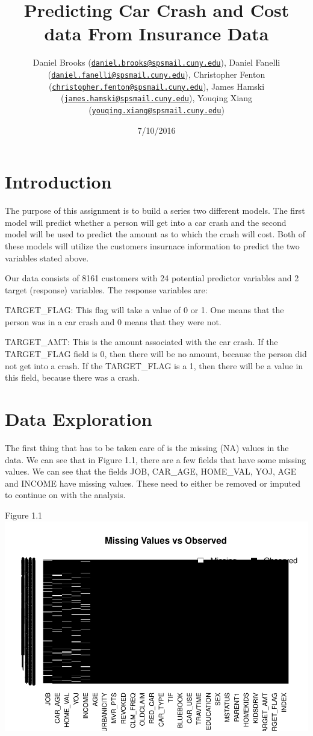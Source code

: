 \documentclass[]{article}
\title{Predicting Car Crash and Cost data From Insurance Data}
\author{Daniel Brooks
(\href{mailto:daniel.brooks@spsmail.cuny.edu}{\nolinkurl{daniel.brooks@spsmail.cuny.edu}}),
Daniel Fanelli
(\href{mailto:daniel.fanelli@spsmail.cuny.edu}{\nolinkurl{daniel.fanelli@spsmail.cuny.edu}}),
Christopher Fenton
(\href{mailto:christopher.fenton@spsmail.cuny.edu}{\nolinkurl{christopher.fenton@spsmail.cuny.edu}}),
James Hamski
(\href{mailto:james.hamski@spsmail.cuny.edu}{\nolinkurl{james.hamski@spsmail.cuny.edu}}),
Youqing Xiang
(\href{mailto:youqing.xiang@spsmail.cuny.edu}{\nolinkurl{youqing.xiang@spsmail.cuny.edu}})}
\date{7/10/2016}
\begin{document}
\maketitle


\section{Introduction}\label{introduction}

The purpose of this assignment is to build a series two different
models. The first model will predict whether a person will get into a
car crash and the second model will be used to predict the amount as to
which the crash will cost. Both of these models will utilize the
customers insurnace information to predict the two variables stated
above.

Our data consists of 8161 customers with 24 potential predictor
variables and 2 target (response) variables. The response variables are:

TARGET\_FLAG: This flag will take a value of 0 or 1. One means that the
person was in a car crash and 0 means that they were not.

TARGET\_AMT: This is the amount associated with the car crash. If the
TARGET\_FLAG field is 0, then there will be no amount, because the
person did not get into a crash. If the TARGET\_FLAG is a 1, then there
will be a value in this field, because there was a crash.

\section{Data Exploration}\label{data-exploration}

The first thing that has to be taken care of is the missing (NA) values
in the data. We can see that in Figure 1.1, there are a few fields that
have some missing values. We can see that the fields JOB, CAR\_AGE,
HOME\_VAL, YOJ, AGE and INCOME have missing values. These need to either
be removed or imputed to continue on with the analysis.

Figure 1.1
\includegraphics{DATA621-Homework-4_files/figure-latex/unnamed-chunk-3-1.pdf}
\end{document}
